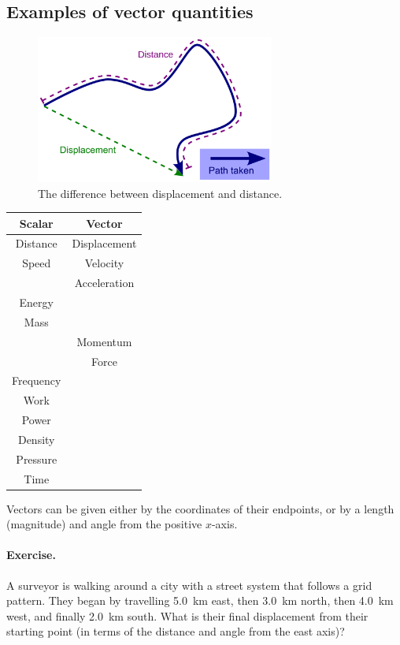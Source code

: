 \documentclass[a4paper]{amsbook}
\begin{document}
\subsection{Examples of vector quantities}
\begin{figure}
  \centering
  \includegraphics[width=0.7\textwidth]{displacement}
  \caption{The difference between displacement and distance.\label{fig:displacement}}
\end{figure}

\begin{center}
\begin{tabular}{c|c}
  \textbf{Scalar} & \textbf{Vector}\\\hline
  Distance & Displacement\\
  Speed & Velocity\\
  & Acceleration\\
  Energy &\\
  Mass &\\
  & Momentum\\
  & Force\\
  Frequency&\\
  Work &\\
  Power &\\
  Density &\\
  Pressure &\\
  Time &
\end{tabular}
\end{center}

Vectors can be given either by the coordinates of their endpoints, or by a length (magnitude) and angle from the positive $ x$-axis.

\paragraph{Exercise.} A surveyor is walking around a city with a street system that follows a grid pattern. They
began by travelling \SI{5.0}{\kilo\metre} east, then \SI{3.0}{\kilo\metre} north, then \SI{4.0}{\kilo\metre} west, and finally \SI{2.0}{\kilo\metre}
south. What is their final displacement from their starting point (in terms of the distance and angle from the east axis)?
\end{document}

